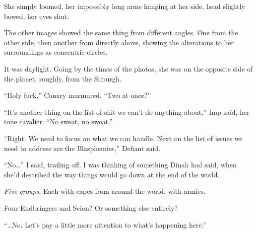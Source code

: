 She simply loomed, her impossibly long arms hanging at her side, head slightly bowed, her eyes shut.



The other images showed the same thing from different angles.  One from the other side, then another from directly above, showing the alterations to her surroundings as concentric circles.



It was daylight.  Going by the times of the photos, she was on the opposite side of the planet, roughly, from the Simurgh.



``Holy fuck,'' Canary murmured.  ``Two at once?''



``It's another thing on the list of shit we can't do anything about,'' Imp said, her tone cavalier.  ``No sweat, no sweat.''



``Right.  We need to focus on what we can handle.  Next on the list of issues we need to address are the Blasphemies,'' Defiant said.



``No\ldots'' I said, trailing off.  I was thinking of something Dinah had said, when she'd described the way things would go down at the end of the world.



\emph{Five groups}.  Each with capes from around the world, with armies.



Four Endbringers and Scion?  Or something else entirely?



``\ldots{}No.  Let's pay a little more attention to what's happening here.''





